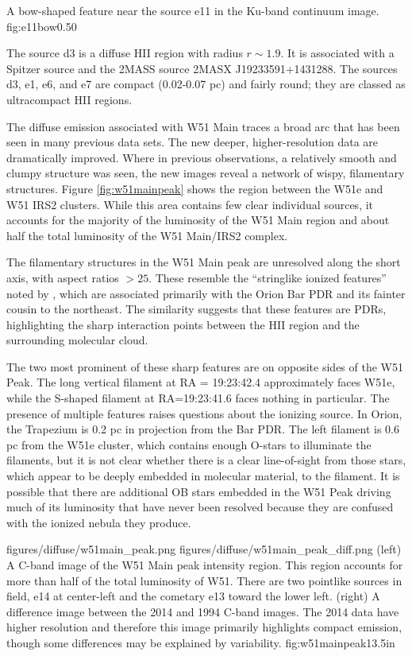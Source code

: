 {A bow-shaped feature near the source e11 in the Ku-band continuum image.}
{fig:e11bow}{0.5}{0}

The source d3 is a diffuse HII region with radius $r\sim1.9$\arcsec.  It is
associated with a Spitzer source and the 2MASS source 2MASX J19233591+1431288.
The sources d3, e1, e6, and e7 are compact (0.02-0.07 pc) and fairly round;
they are classed as ultracompact HII regions.

The diffuse emission associated with W51 Main traces a broad arc that has been
seen in many previous data sets.  The new deeper, higher-resolution data are
dramatically improved.  Where in previous observations, a relatively smooth and
clumpy structure was seen, the new images reveal a network of wispy,
filamentary structures.  Figure \ref{fig:w51mainpeak} shows the region between
the W51e and W51 IRS2 clusters.  While this area contains few clear individual
sources, it accounts for the majority of the luminosity of the W51 Main region
and about half the total luminosity of the W51 Main/IRS2 complex.  

The filamentary structures in the W51 Main peak are unresolved along the short
axis, with aspect ratios $>25$.   These resemble the ``stringlike ionized
features'' noted by \citet[][see
\url{http://images.nrao.edu/402}]{Yusef-Zadeh1990a}, which are associated
primarily with the Orion Bar PDR and its fainter cousin to the northeast.  The
similarity suggests that these features are PDRs, highlighting the sharp
interaction points between the HII region and the surrounding molecular cloud.

The two most prominent of these sharp features are on opposite sides of the W51
Peak.  The long vertical filament at RA = 19:23:42.4 approximately faces W51e,
while the S-shaped filament at RA=19:23:41.6 faces nothing in particular.  The
presence of multiple features raises questions about the ionizing source.  In
Orion, the Trapezium is 0.2 pc in projection from the Bar PDR.  The left
filament is 0.6 pc from the W51e cluster, which contains enough O-stars to
illuminate the filaments, but it is not clear whether there is a clear
line-of-sight from those stars, which appear to be deeply embedded in molecular
material, to the filament.  It is possible that there are additional OB stars
embedded in the W51 Peak driving much of its luminosity that have never been
resolved because they are confused with the ionized nebula they produce.

\FigureTwo
{figures/diffuse/w51main_peak.png}
{figures/diffuse/w51main_peak_diff.png}
{(left) A C-band image of the W51 Main peak intensity region.  This region
accounts for more than half of the total luminosity of W51.  There are two
pointlike sources in field, e14 at center-left and the cometary e13 toward the
lower left. (right) A difference image between the 2014 and 1994 C-band images.
The 2014 data have higher resolution and therefore this image primarily
highlights compact emission, though some differences may be explained by
variability.}
{fig:w51mainpeak}{1}{3.5in}

